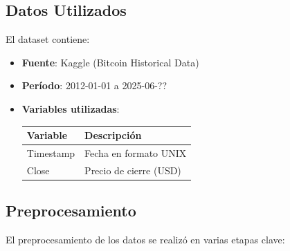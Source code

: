 \documentclass[12pt]{article}
\begin{document}
\subsection{Datos Utilizados}
El dataset contiene:

\begin{itemize}
\item \textbf{Fuente}: Kaggle (Bitcoin Historical Data)
\item \textbf{Período}: 2012-01-01 a 2025-06-?? %
\item \textbf{Variables utilizadas}:
\begin{table}[H]
\centering
\begin{tabular}{ll}
\toprule
\textbf{Variable} & \textbf{Descripción} \\
\midrule
Timestamp & Fecha en formato UNIX \\
Close & Precio de cierre (USD) \\
\bottomrule
\end{tabular}
\end{table}
\end{itemize}


\bigskip
\subsection{Preprocesamiento}

El preprocesamiento de los datos se realizó en varias etapas clave:
\end{document}

